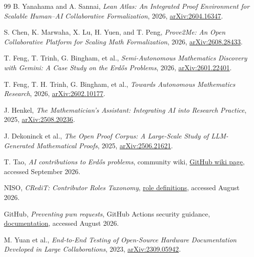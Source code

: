 \documentclass[10pt]{article}
\begin{document}
\begin{thebibliography}{99}
B. Yanahama and A. Sannai, \emph{Lean Atlas: An Integrated Proof Environment
for Scalable Human--AI Collaborative Formalization}, 2026,
\href{https://arxiv.org/abs/2604.16347}{arXiv:2604.16347}.

S. Chen, K. Marwaha, X. Lu, H. Yuen, and T. Peng, \emph{Prove2Me: An Open
Collaborative Platform for Scaling Math Formalization}, 2026,
\href{https://arxiv.org/abs/2608.28433}{arXiv:2608.28433}.

T. Feng, T. Trinh, G. Bingham, et al., \emph{Semi-Autonomous Mathematics
Discovery with Gemini: A Case Study on the Erd\H{o}s Problems}, 2026,
\href{https://arxiv.org/abs/2601.22401}{arXiv:2601.22401}.

T. Feng, T. H. Trinh, G. Bingham, et al., \emph{Towards Autonomous
Mathematics Research}, 2026,
\href{https://arxiv.org/abs/2602.10177}{arXiv:2602.10177}.

J. Henkel, \emph{The Mathematician's Assistant: Integrating AI into Research
Practice}, 2025,
\href{https://arxiv.org/abs/2508.20236}{arXiv:2508.20236}.

J. Dekoninck et al., \emph{The Open Proof Corpus: A Large-Scale Study of
LLM-Generated Mathematical Proofs}, 2025,
\href{https://arxiv.org/abs/2506.21621}{arXiv:2506.21621}.

T. Tao, \emph{AI contributions to Erd\H{o}s problems}, community wiki,
\href{https://github.com/teorth/erdosproblems/wiki/AI-contributions-to-Erd%C5%91s-problems}{GitHub wiki page},
accessed September 2026.

NISO, \emph{CRediT: Contributor Roles Taxonomy},
\href{https://credit.niso.org/contributor-roles-defined/}{role definitions},
accessed August 2026.

GitHub, \emph{Preventing pwn requests}, GitHub Actions security guidance,
\href{https://docs.github.com/en/actions/reference/security/secure-use}{documentation},
accessed August 2026.

M. Yuan et al., \emph{End-to-End Testing of Open-Source Hardware Documentation
Developed in Large Collaborations}, 2023,
\href{https://arxiv.org/abs/2309.05942}{arXiv:2309.05942}.

\end{thebibliography}
\end{document}
